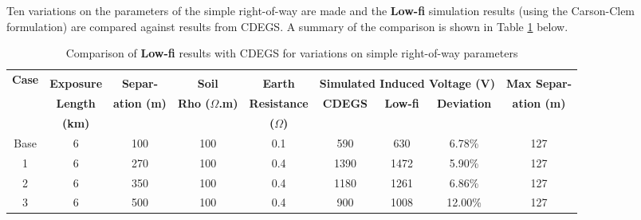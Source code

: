 \documentclass{article}
\begin{document}
Ten variations on the parameters of the simple right-of-way are made and the \textbf{Low-fi} simulation results (using the Carson-Clem formulation) are compared against results from CDEGS. A summary of the comparison is shown in Table \ref{tab:simple_cdegs} below.

\begin{table}[!htp]
\caption{Comparison of \textbf{Low-fi} results with CDEGS for variations on simple right-of-way parameters}
\label{tab:simple_cdegs}
\begin{tabular}{@{}ccccccccc@{}}
\toprule
\multirow{3}{*}{\textbf{Case}} \\& \textbf{Exposure}  & \textbf{Separ-} & \textbf{Soil} & \textbf{Earth}  & \multicolumn{3}{c}{\textbf{Simulated Induced Voltage (V)}} & \textbf{Max Separ-} \\ \cmidrule(lr){6-8}
& \textbf{Length} & \textbf{ation (m)} & \textbf{Rho ($\Omega$.m)} &  \textbf{Resistance}                                                      & \textbf{CDEGS}   & \textbf{Low-fi}   & \textbf{\parbox{0.1\textwidth}{Deviation}}  &  \textbf{ation (m)}  \\
& \textbf{(km)} &  &  &  \textbf{($\Omega$)} &   &   &   &                                       \\ \midrule
Base                              & 6                                              & 100                                      & 100                                                & 0.1                                                    & 590              & 630               & 6.78\%              & 127                                              \\ \midrule
1                              & 6                                              & 270                                      & 100                                                & 0.4                                                    & 1390             & 1472              & 5.90\%              & 127                                              \\ \midrule
2                              & 6                                              & 350                                      & 100                                                & 0.4                                                    & 1180             & 1261              & 6.86\%              & 127                                              \\ \midrule
3                              & 6                                              & 500                                      & 100                                                & 0.4                                                    & 900              & 1008              & 12.00\%             & 127                                              \\ \midrule

\end{tabular}
\end{table}
\end{document}
